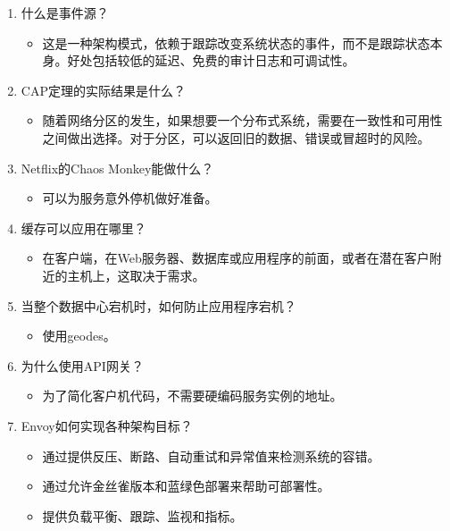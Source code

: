 \begin{enumerate}
\item
什么是事件源？
\begin{itemize}
\item 
这是一种架构模式，依赖于跟踪改变系统状态的事件，而不是跟踪状态本身。好处包括较低的延迟、免费的审计日志和可调试性。
\end{itemize}

\item 
CAP定理的实际结果是什么？
\begin{itemize}
\item 
随着网络分区的发生，如果想要一个分布式系统，需要在一致性和可用性之间做出选择。对于分区，可以返回旧的数据、错误或冒超时的风险。
\end{itemize}

\item 
Netflix的Chaos Monkey能做什么？
\begin{itemize}
\item 
可以为服务意外停机做好准备。
\end{itemize}

\item 
缓存可以应用在哪里？
\begin{itemize}
\item 
在客户端，在Web服务器、数据库或应用程序的前面，或者在潜在客户附近的主机上，这取决于需求。
\end{itemize}

\item 
当整个数据中心宕机时，如何防止应用程序宕机？
\begin{itemize}
\item 
使用geodes。
\end{itemize}

\item 
为什么使用API网关？
\begin{itemize}
\item 
为了简化客户机代码，不需要硬编码服务实例的地址。
\end{itemize}

\item 
Envoy如何实现各种架构目标？
\begin{itemize}
\item 
通过提供反压、断路、自动重试和异常值来检测系统的容错。

\item 
通过允许金丝雀版本和蓝绿色部署来帮助可部署性。

\item 
提供负载平衡、跟踪、监视和指标。
\end{itemize}
\end{enumerate}